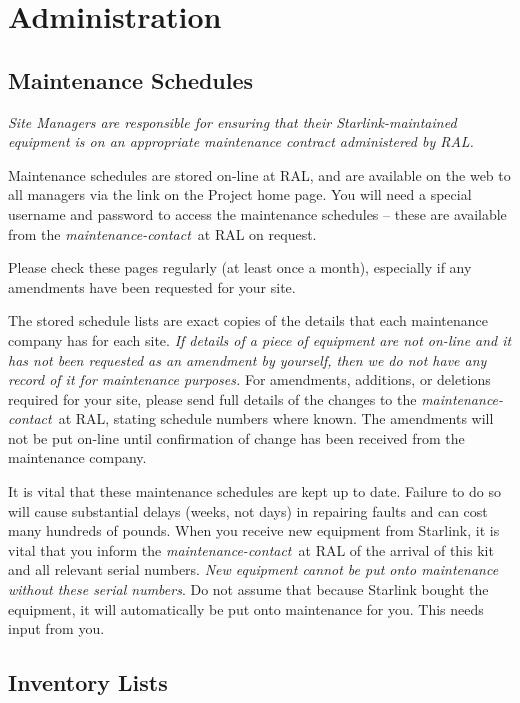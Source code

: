 \newpage

\section {\label{administration}Administration}

\subsection {Maintenance Schedules}

{\em Site Managers are responsible for ensuring that their Starlink-maintained
equipment is on an appropriate maintenance contract administered by RAL.}

Maintenance schedules are stored on-line at RAL, and are available on the
web to all managers via the
link on the Project home page.
You will need a special username and password to access the maintenance
schedules -- these  are available from the {\em maintenance-contact}\, at RAL
on request.

Please check these pages regularly (at least once a month), especially if any
amendments have been requested for your site. 

The stored schedule lists are exact copies of the details that each maintenance
company has for each site.
{\em If details of a piece of equipment are not on-line and it has not been
requested as an amendment by yourself, then we do not have any record of it
for maintenance purposes.}
For amendments, additions, or deletions required for your site, please send
full details of the changes to the {\em maintenance-contact}\, at RAL, stating
schedule numbers where known.
The amendments will not be put on-line until confirmation of change has been
received from the maintenance company.

It is vital that these maintenance schedules are kept up to date.
Failure to do so will cause substantial delays (weeks, not days) in
repairing faults and can cost many hundreds of pounds.
When you receive new equipment from Starlink, it is vital that you inform the
{\em maintenance-contact}\, at RAL of the arrival of this kit and all relevant
serial numbers.
{\em New equipment cannot be put onto maintenance without these serial
numbers}.
Do not assume that because Starlink bought the equipment, it will automatically
be put onto maintenance for you.
This needs input from you.

\subsection{Inventory Lists}


